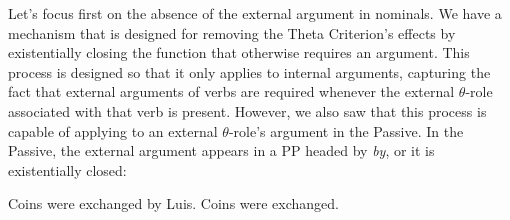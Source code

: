Let's focus first on the absence of the external argument in nominals.%
%
%
%
We have a mechanism that is designed for removing the Theta Criterion's effects by existentially closing the function that otherwise requires an argument. This process is designed so that it only applies to internal arguments, capturing the fact that external arguments of verbs are required whenever the external $\theta$-role associated with that verb is present. However, we also saw that this process is capable of applying to an external $\theta$-role's argument in the Passive. In the Passive, the external argument appears in a PP headed by \emph{by}, or it is existentially closed:
\begin{exe}
	\raggedright
	\ex \label{ex5:passivee} 
	\begin{xlist}
		\ex Coins were exchanged by Luis.
		\ex Coins were exchanged.
	\end{xlist}
\end{exe}

